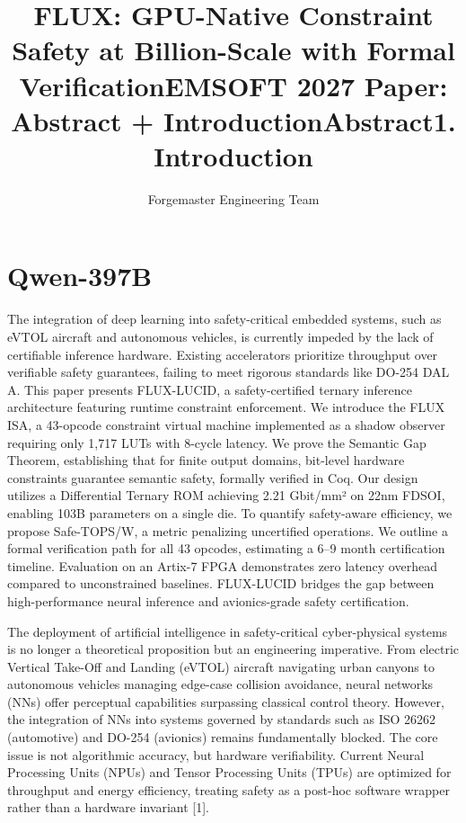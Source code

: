 \documentclass[sigplan,review,anonymous]{acmart}
\title{FLUX: GPU-Native Constraint Safety at Billion-Scale with Formal Verification}
\author{Forgemaster Engineering Team}
\affiliation{SuperInstance / Cocapn Fleet}
\begin{document}
\maketitle

\title{EMSOFT 2027 Paper: Abstract + Introduction}
\section{Qwen-397B}



\title{Abstract}

The integration of deep learning into safety-critical embedded systems, such as eVTOL aircraft and autonomous vehicles, is currently impeded by the lack of certifiable inference hardware. Existing accelerators prioritize throughput over verifiable safety guarantees, failing to meet rigorous standards like DO-254 DAL A. This paper presents FLUX-LUCID, a safety-certified ternary inference architecture featuring runtime constraint enforcement. We introduce the FLUX ISA, a 43-opcode constraint virtual machine implemented as a shadow observer requiring only 1,717 LUTs with 8-cycle latency. We prove the Semantic Gap Theorem, establishing that for finite output domains, bit-level hardware constraints guarantee semantic safety, formally verified in Coq. Our design utilizes a Differential Ternary ROM achieving 2.21 Gbit/mm² on 22nm FDSOI, enabling 103B parameters on a single die. To quantify safety-aware efficiency, we propose Safe-TOPS/W, a metric penalizing uncertified operations. We outline a formal verification path for all 43 opcodes, estimating a 6–9 month certification timeline. Evaluation on an Artix-7 FPGA demonstrates zero latency overhead compared to unconstrained baselines. FLUX-LUCID bridges the gap between high-performance neural inference and avionics-grade safety certification.

\title{1. Introduction}

The deployment of artificial intelligence in safety-critical cyber-physical systems is no longer a theoretical proposition but an engineering imperative. From electric Vertical Take-Off and Landing (eVTOL) aircraft navigating urban canyons to autonomous vehicles managing edge-case collision avoidance, neural networks (NNs) offer perceptual capabilities surpassing classical control theory. However, the integration of NNs into systems governed by standards such as ISO 26262 (automotive) and DO-254 (avionics) remains fundamentally blocked. The core issue is not algorithmic accuracy, but hardware verifiability. Current Neural Processing Units (NPUs) and Tensor Processing Units (TPUs) are optimized for throughput and energy efficiency, treating safety as a post-hoc software wrapper rather than a hardware invariant [1].
\end{document}

